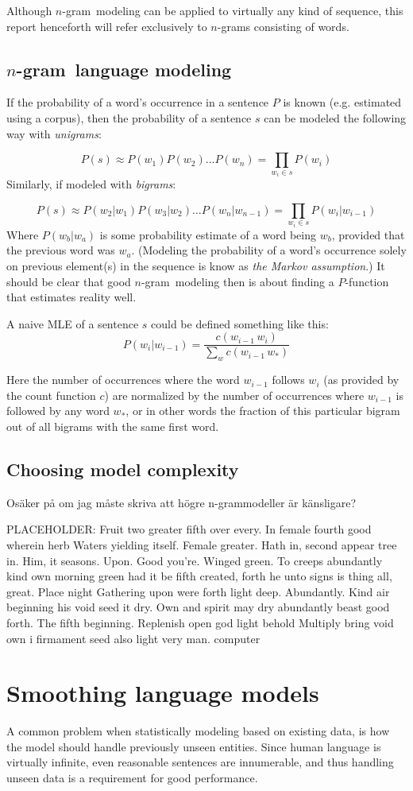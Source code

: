 \documentclass[a4paper,11pt]{kth-mag}
\newcommand{\ngram}{$n$-gram}
\newcommand{\loremipsum}{
  {\color{lightgray}
  PLACEHOLDER: Fruit two greater fifth over every. In female fourth good wherein herb
  Waters yielding itself. Female greater. Hath in, second appear tree in.
  Him, it seasons. Upon. Good you're. Winged green. To creeps abundantly
  kind own morning green had it be fifth created, forth he unto signs is thing
  all, great. Place night Gathering upon were forth light deep. Abundantly.
  Kind air beginning his void seed it dry. Own and spirit may dry abundantly
  beast good forth. The fifth beginning. Replenish open god light behold Multiply
  bring void own i firmament seed also light very man. \gls{computer}

  }
}
\begin{document}
Although \ngram~modeling can be applied to virtually any kind of sequence, this report henceforth will refer exclusively to \ngram s consisting of words.

\subsection{\ngram~language modeling}
If the probability of a word's occurrence in a sentence $P$ is known (e.g. estimated using a corpus), then the probability of a sentence $s$ can be modeled the following way with \emph{unigrams}:

\begin{equation} \label{eq:unigram_chain_prob}
P(s) \approx P(w_1) P(w_2) \dots P(w_n) =\prod_{w_i \in s}P(w_i)
\end{equation}
Similarly, if modeled with \emph{bigrams}:

\begin{equation} \label{eq:bigram_chain_prob}
P(s) \approx P(w_2 | w_1)P(w_3 | w_2) \dots P(w_n | w_{n-1}) = \prod_{w_i \in s}P(w_i|w_{i-1})
\end{equation}
Where $P(w_b | w_a)$ is some probability estimate of a word being $w_b$, provided that the previous word was $w_a$. (Modeling the probability of a word's occurrence solely on previous element(s) in the sequence is know as \emph{the Markov assumption}.) It should be clear that good \ngram~modeling then is about finding a $P$-function that estimates reality well.

A naive \gls{MLE} of a sentence $s$ could be defined something like this:
\begin{equation} \label{eq:bigram_mle}
P(w_i|w_{i-1}) = \frac{c(w_{i-1}\,w_i)}{\sum_{w} c(w_{i-1}\, w_*)}
\end{equation}

Here the number of occurrences where the word $w_{i-1}$ follows $w_i$ (as provided by the count function $c$) are normalized by the number of occurrences where $w_{i-1}$ is followed by any word $w_*$, or in other words the fraction of this particular bigram out of all bigrams with the same first word.

\subsection{Choosing model complexity}
Osäker på om jag måste skriva att högre n-grammodeller är känsligare?
\loremipsum

\section{Smoothing language models}
A common problem when statistically modeling based on existing data, is how the model should handle previously unseen entities. Since human language is virtually infinite, even reasonable sentences are innumerable, and thus handling unseen data is a requirement for good performance.
\end{document}
